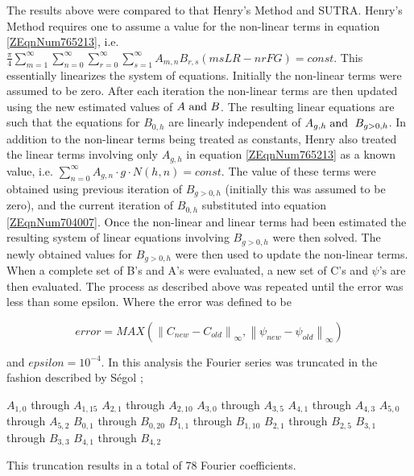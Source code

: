 The results above were compared to that Henry's Method and SUTRA. Henry's Method requires one to
assume a value for the non-linear terms in equation \eqref{ZEqnNum765213}, i.e. $\frac{\pi }{4} \sum
_{m=1}^{\infty } \sum _{n=0}^{\infty } \sum _{r=0}^{\infty } \sum _{s=1}^{\infty }A_{m,n} B_{r,s}
\left(msLR-nrFG\right) =const$. This essentially linearizes the system of equations. Initially the
non-linear terms were assumed to be zero. After each iteration the non-linear terms are then updated
using the new estimated values of $A\text{ and } B$. The resulting linear equations are such that the
equations for $B_{0,h} $ are linearly independent of $A_{g,h} \;  \text{and\; } B_{g>0,h} $. In
addition to the non-linear terms being treated as constants, Henry also treated the linear terms
involving only $A_{g,h} $ in equation \eqref{ZEqnNum765213} as a known value, i.e. $\sum
_{n=0}^{\infty }A_{g,n} \cdot g\cdot N\left(h,n\right) =const$. The value of these terms were
obtained using previous iteration of $B_{g>0,h} $ (initially this was assumed to be zero), and the
current iteration of $B_{0,h} $ substituted into equation \eqref{ZEqnNum704007}. Once the non-linear
and linear terms had been estimated the resulting system of linear equations involving $B_{g>0,h} $
were then solved. The newly obtained values for $B_{g>0,h} $ were then used to update the non-linear
terms. When a complete set of B's and A's were evaluated, a new set of C's and $\psi  \text{'s} $
are then evaluated. The process as described above was repeated until the error was less than some
epsilon. Where the error was defined to be 

\begin{equation} \label{5.1} 
    error = MAX\left(\left\| C_{new} -C_{old} \right\|_{\infty } ,\left\| 
    \psi _{new} -\psi _{old} \right\| _{\infty } \right)
\end{equation} 

and $epsilon=10^{-4} $. In this analysis the Fourier series was truncated in the fashion described
by S\'egol \cite{Segol};

\begin{center}
    $A_{1,0}$ through $A_{1,15}$
    $A_{2,1}$ through $A_{2,10}$
    $A_{3,0}$ through $A_{3,5}$
    $A_{4,1}$ through $A_{4,3}$
    $A_{5,0}$ through $A_{5,2}$
    $B_{0,1}$ through $B_{0,20}$
    $B_{1,1}$ through $B_{1,10}$
    $B_{2,1}$ through $B_{2,5}$
    $B_{3,1}$ through $B_{3,3}$
    $B_{4,1}$ through $B_{4,2}$
\end{center}

This truncation results in a total of 78 Fourier coefficients. 

